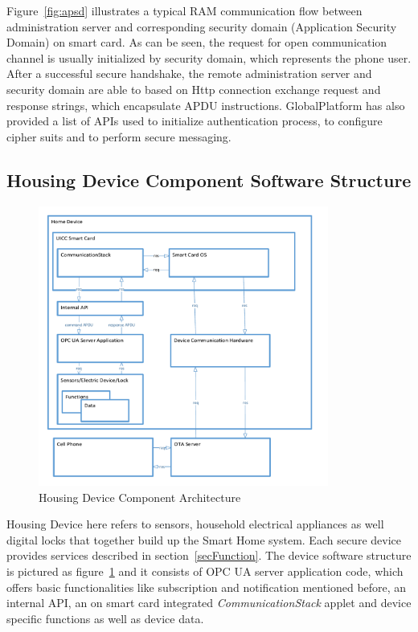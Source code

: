 Figure~\ref{fig:apsd} illustrates a typical RAM communication flow between administration server and corresponding security domain (Application Security Domain) on smart card. As can be seen, the request for open communication channel is usually initialized by security domain, which represents the phone user. After a successful secure handshake, the remote administration server and security domain are able to based on Http connection exchange request and response strings, which encapsulate APDU instructions. GlobalPlatform has also provided  a list of APIs used to initialize authentication process, to configure cipher suits and to perform secure messaging.

\subsection{Housing Device Component Software Structure}

\begin{figure}[!htb]
	\centering
	\includegraphics[width=0.85\textwidth]{serverStructure}
		\caption{Housing Device Component Architecture}
	\label{fig:serverStructure}
\end{figure}
Housing Device here refers to sensors, household electrical appliances as well digital locks that together build up the Smart Home system. Each secure device provides services described in section~\ref{secFunction}. The device software structure is pictured as figure~\ref{fig:serverStructure} and it consists of OPC UA server application code, which offers basic functionalities like subscription and notification mentioned before, an internal API, an on smart card integrated \emph{CommunicationStack} applet and device specific functions as well as device data.

